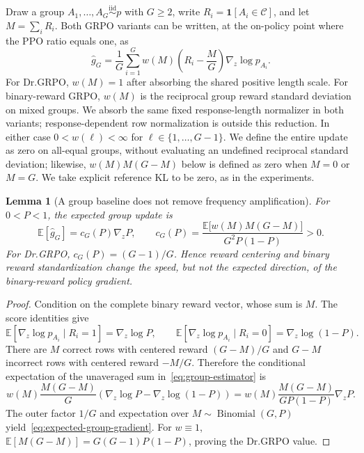 \documentclass{article}
\newcommand{\1}{\mathbf 1}
\newcommand{\E}{\mathbb E}
\newtheorem{lemma}{Lemma}[section]
\theoremstyle{remark}
\theoremstyle{definition}
\theoremstyle{plain}
\begin{document}
Draw a group $A_1,\ldots,A_G\stackrel{\mathrm{iid}}{\sim}p$ with $G\ge2$,
write $R_i=\1[A_i\in\mathcal C]$, and let $M=\sum_iR_i$. Both GRPO variants
can be written, at the on-policy point where the PPO ratio equals one, as
\begin{equation}
  \widehat g_G
  =\frac1G\sum_{i=1}^G
   w(M)\left(R_i-\frac{M}{G}\right)\nabla_z\log p_{A_i}.
  \label{eq:group-estimator}
\end{equation}
For Dr.GRPO, $w(M)=1$ after absorbing the shared positive length scale. For
binary-reward GRPO, $w(M)$ is the reciprocal group reward standard deviation
on mixed groups. We absorb the same fixed response-length normalizer in both
variants; response-dependent row normalization is outside this reduction.
In either case $0<w(\ell)<\infty$ for $\ell\in\{1,\ldots,G-1\}$.
We define the entire update as zero on all-equal groups, without evaluating an
undefined reciprocal standard deviation; likewise, $w(M)M(G-M)$ below is
defined as zero when $M=0$ or $M=G$. We take explicit reference KL to be zero, as
in the experiments.

\begin{lemma}[A group baseline does not remove frequency amplification]
\label{lem:grpo-mean}
For $0<P<1$, the expected group update is
\begin{equation}
  \E[\widehat g_G]
  =c_G(P)\nabla_z P,
  \qquad
  c_G(P)=
  \frac{\E\!\big[w(M)M(G-M)\big]}{G^2P(1-P)}>0.
  \label{eq:expected-group-gradient}
\end{equation}
For Dr.GRPO, $c_G(P)=(G-1)/G$. Hence reward centering and binary reward
standardization change the speed, but not the expected direction, of the
binary-reward policy gradient.
\end{lemma}

\begin{proof}
Condition on the complete binary reward vector, whose sum is $M$. The score
identities give
\[
  \E[\nabla_z\log p_{A_i}\mid R_i=1]=\nabla_z\log P,
  \qquad
  \E[\nabla_z\log p_{A_i}\mid R_i=0]
  =\nabla_z\log(1-P).
\]
There are $M$ correct rows with centered reward $(G-M)/G$ and $G-M$
incorrect rows with centered reward $-M/G$. Therefore the conditional
expectation of the unaveraged sum in~\eqref{eq:group-estimator} is
\[
  w(M)\frac{M(G-M)}{G}
  \left(\nabla_z\log P-\nabla_z\log(1-P)\right)
  =w(M)\frac{M(G-M)}{GP(1-P)}\nabla_zP.
\]
The outer factor $1/G$ and expectation over
$M\sim\operatorname{Binomial}(G,P)$ yield~\eqref{eq:expected-group-gradient}.
For $w\equiv1$,
$\E[M(G-M)]=G(G-1)P(1-P)$, proving the Dr.GRPO value.
\end{proof}
\end{document}
